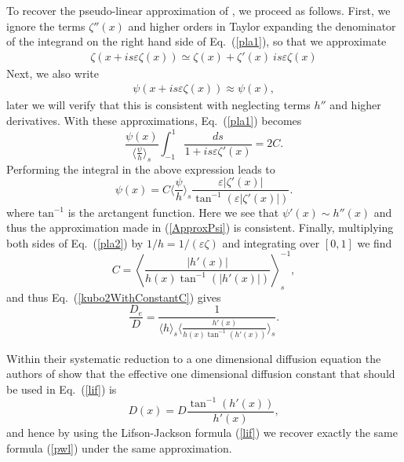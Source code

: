 \documentclass[pre,showpacs,preprintnumbers,amsmath,amssymb,superscriptaddress]{revtex4-1}
\begin{document}
{{To recover the pseudo-linear approximation of \cite{kal2006}, we proceed as follows. First, we ignore the terms $\zeta''(x)$ and higher orders in Taylor expanding the denominator of the integrand on the right hand side of Eq.~(\ref{pla1}), so that we approximate
\begin{align}
\zeta(x+i s \varepsilon \zeta(x))\simeq \zeta(x)+\zeta'(x) \ i s \varepsilon \zeta(x)
\end{align}
Next, we also write 
\begin{align}
\psi\left(x + is\varepsilon\zeta(x)\right)\approx\psi(x), \label{ApproxPsi}
\end{align}
later we will verify that this is consistent with neglecting terms $h''$ and higher derivatives. With these approximations, Eq.~(\ref{pla1}) becomes
\begin{equation}
\frac{\psi(x)}{\langle \frac{\psi}{h}\rangle_s} \int_{-1}^1 \frac{ds}{1+i s \varepsilon \zeta'(x)} =2C .
\end{equation}
Performing the integral in the above expression leads to
 \begin{equation}
\psi(x) = C\langle \frac{\psi}{h}\rangle_s \frac{\varepsilon |\zeta'(x)|}{\tan^{-1}(\varepsilon |\zeta'(x)|)}.
\label{pla2}
\end{equation}
where $\mathrm{tan}^{-1}$ is the arctangent function. Here we see that $\psi'(x)\sim h''(x)$ and thus the approximation made in (\ref{ApproxPsi}) is consistent. Finally,
multiplying both sides of Eq.~(\ref{pla2}) by $1/h=1/(\varepsilon\zeta)$ and integrating over $[0,1]$ we find
\begin{equation}
C = \left\langle\frac{ |h'(x)|}{h(x)\tan^{-1}( |h'(x)|)}\right\rangle_s^{-1},
\end{equation}
and thus Eq.~(\ref{kubo2WithConstantC}) gives
\begin{equation}
\frac{D_e}{D} = \frac{1}{\langle h \rangle_s \langle\frac{ h'(x)}{h(x)\tan^{-1}(h'(x))}\rangle_s}.\label{pwl}
\end{equation}

Within their systematic reduction to a one dimensional diffusion equation the authors of \cite{kal2006} show that the effective one dimensional diffusion constant that should be used in
Eq.~(\ref{lif}) is 
\begin{equation}
D(x) = D \frac{\tan^{-1}\left(h'(x)\right)}{h'(x)},
\end{equation}
and hence by using the Lifson-Jackson formula (\ref{lif}) we recover exactly the same formula (\ref{pwl}) under the same approximation. 


}}
\end{document}
